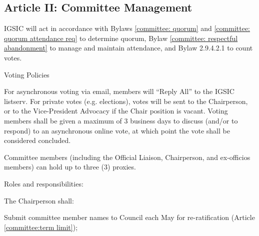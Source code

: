 \subsection{Article II: Committee Management}
\begin{longenum}[ label*=\thesubsection.\arabic*., align=left] 
\item IGSIC will act in accordance with Bylaws \ref{committee: quorum} and \ref{committee: quorum attendance req} to determine quorum, Bylaw \ref{committee: respectful abandonment} to manage and maintain attendance, and Bylaw 2.9.4.2.1 to count votes.
\item Voting Policies
	\begin{longenum}[ label*=\arabic*., align=left]
		\item For asynchronous voting via email, members will ``Reply All'' to the IGSIC listserv. For private votes (e.g. elections), votes will be sent to the Chairperson, or to the Vice-President Advocacy if the Chair position is vacant. Voting members shall be given a maximum of 3 business days to discuss (and/or to respond) to an asynchronous online vote, at which point the vote shall be considered concluded.
		\item Committee members (including the Official Liaison, Chairperson, and ex-officios members) can hold up to three (3) proxies.
	\end{longenum}
\item Roles and responsibilities:
\begin{longenum}[ label*=\arabic*., align=left]
	\item The Chairperson shall:
	\begin{longenum}[ label*=\arabic*., align=left]
		\item Submit committee member names to Council each May for re-ratification (Article \ref{committee:term limit});

\end{longenum}
\end{longenum}
\end{longenum}
